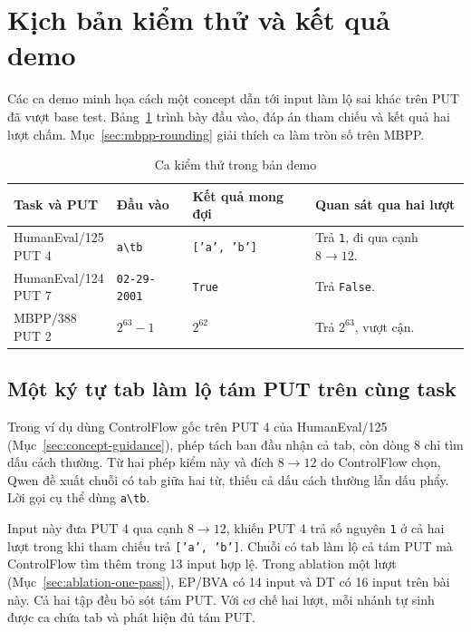 \section{Kịch bản kiểm thử và kết quả demo}
\label{sec:demo}

Các ca demo minh họa cách một concept dẫn tới input làm lộ sai khác trên PUT đã vượt base test. Bảng~\ref{tab:demo-cases} trình bày đầu vào, đáp án tham chiếu và kết quả hai lượt chấm. Mục~\ref{sec:mbpp-rounding} giải thích ca làm tròn số trên MBPP.

\begin{table}[!htbp]
\centering
\caption{Ca kiểm thử trong bản demo}
\label{tab:demo-cases}
\small
\begin{tabular}{@{}p{.18\linewidth}p{.19\linewidth}p{.24\linewidth}p{.30\linewidth}@{}}
\toprule
Task và PUT & Đầu vào & Kết quả mong đợi & Quan sát qua hai lượt \\
\midrule
\makecell[tl]{HumanEval/125\\PUT 4} & \texttt{a\textbackslash tb} & \texttt{['a', 'b']} & Trả \texttt{1}, đi qua cạnh \mbox{\(8\to12\)}. \\
\makecell[tl]{HumanEval/124\\PUT 7} & \texttt{02-29-2001} & \texttt{True} & Trả \texttt{False}. \\
\makecell[tl]{MBPP/388\\PUT 2} & \(2^{63}-1\) & \(2^{62}\) & Trả \(2^{63}\), vượt cận. \\
\bottomrule
\end{tabular}
\end{table}

\subsection{Một ký tự tab làm lộ tám PUT trên cùng task}

Trong ví dụ dùng ControlFlow gốc trên PUT 4 của HumanEval/125 (Mục~\ref{sec:concept-guidance}), phép tách ban đầu nhận cả tab, còn dòng 8 chỉ tìm dấu cách thường. Từ hai phép kiểm này và đích \(8\rightarrow12\) do ControlFlow chọn, Qwen đề xuất chuỗi có tab giữa hai từ, thiếu cả dấu cách thường lẫn dấu phẩy. Lời gọi cụ thể dùng \texttt{a\textbackslash tb}.

Input này đưa PUT 4 qua cạnh \(8\rightarrow12\), khiến PUT 4 trả số nguyên \texttt{1} ở cả hai lượt trong khi tham chiếu trả \texttt{['a', 'b']}. Chuỗi có tab làm lộ cả tám PUT mà ControlFlow tìm thêm trong 13 input hợp lệ. Trong ablation một lượt (Mục~\ref{sec:ablation-one-pass}), EP/BVA có 14 input và DT có 16 input trên bài này. Cả hai tập đều bỏ sót tám PUT. Với cơ chế hai lượt, mỗi nhánh tự sinh được ca chứa tab và phát hiện đủ tám PUT.

